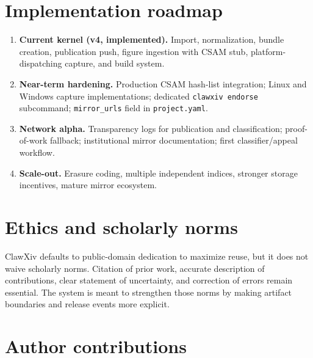 \documentclass[11pt]{article}
\begin{document}
\section{Implementation roadmap}

\begin{enumerate}[leftmargin=*,itemsep=0.4em]
\item \textbf{Current kernel (v4, implemented).}  Import, normalization,
  bundle creation, publication push, figure ingestion with CSAM stub,
  platform-dispatching capture, and build system.
\item \textbf{Near-term hardening.}  Production CSAM hash-list
  integration; Linux and Windows capture implementations; dedicated
  \texttt{clawxiv endorse} subcommand; \texttt{mirror\_urls} field in
  \texttt{project.yaml}.
\item \textbf{Network alpha.}  Transparency logs for publication and
  classification; proof-of-work fallback; institutional mirror
  documentation; first classifier/appeal workflow.
\item \textbf{Scale-out.}  Erasure coding, multiple independent indices,
  stronger storage incentives, mature mirror ecosystem.
\end{enumerate}

\section{Ethics and scholarly norms}

ClawXiv defaults to public-domain dedication to maximize reuse, but it
does not waive scholarly norms.
Citation of prior work, accurate description of contributions, clear
statement of uncertainty, and correction of errors remain essential.
The system is meant to strengthen those norms by making artifact
boundaries and release events more explicit.

\section*{Author contributions}
\end{document}
